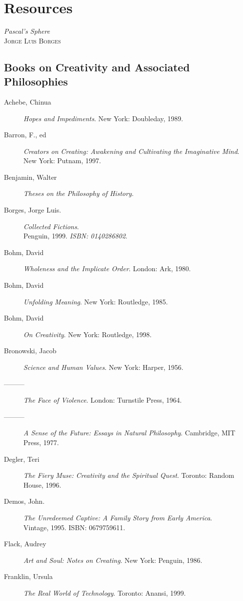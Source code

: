 \documentclass[letterpaper,oneside]{memoir}
\begin{document}
\chapter{Resources}
\begin{epigraphs}
{\textit{Pascal's Sphere} \\
\textsc{Jorge Luis Borges}}
\end{epigraphs}
\section{Books on Creativity and Associated Philosophies}
\begin{description}
\item [Achebe, Chinua] \textit{Hopes and Impediments}. New York: Doubleday, 1989.
\item [Barron, F., ed] \textit{Creators on Creating: Awakening and Cultivating the Imaginative Mind}. New York: Putnam, 1997.
\item [Benjamin, Walter] \textit{Theses on the Philosophy of History}.
\item [Borges, Jorge Luis.] \textit{Collected Fictions}. \\Penguin, 1999. \textsl{ISBN: 0140286802}.
\item [Bohm, David] \textit{Wholeness and the Implicate Order}. London: Ark, 1980.
\item [Bohm, David] \textit{Unfolding Meaning}. New York: Routledge, 1985.
\item [Bohm, David] \textit{On Creativity}. New York: Routledge, 1998.
\item [Bronowski, Jacob] \textit{Science and Human Values}. New York: Harper, 1956.
\item [---------] \textit{The Face of Violence}. London: Turnstile Press, 1964.
\item [---------] \textit{A Sense of the Future: Essays in Natural Philosophy}. Cambridge, MIT Press, 1977.
\item [Degler, Teri] \textit{The Fiery Muse: Creativity and the Spiritual Quest}. Toronto: Random House, 1996.
\item [Demos, John.] \textit{The Unredeemed Captive: A Family Story from Early America}. \\Vintage, 1995. \textsc{ISBN: 0679759611}.
\item [Flack, Audrey] \textit{Art and Soul: Notes on Creating}. New York: Penguin, 1986.
\item [Franklin, Ursula] \textit{The Real World of Technology}. Toronto: Anansi, 1999.

\end{description}
\end{document}
